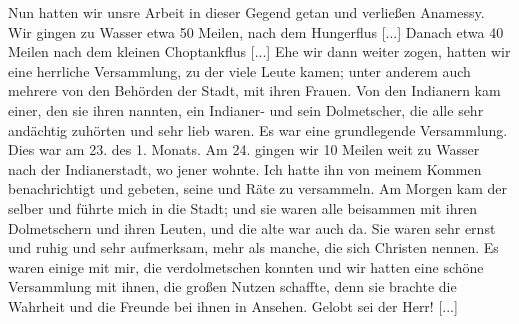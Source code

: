 Nun hatten wir unsre Arbeit in dieser Gegend getan und
verließen Anamessy. Wir gingen zu Wasser etwa 50 Meilen,
nach dem Hungerflus [...] Danach etwa 40 Meilen nach dem
kleinen Choptankflus [...] Ehe wir dann weiter zogen, hatten
wir eine herrliche Versammlung, zu der viele Leute kamen; unter
anderem auch mehrere von den Behörden der Stadt, mit ihren
Frauen. Von den Indianern kam einer, den sie ihren 
nannten, ein Indianer- und sein Dolmetscher, die alle sehr
andächtig zuhörten und sehr lieb waren. Es war eine grundlegende 
Versammlung. Dies war am 23. des 1. Monats. Am
24. gingen wir 10 Meilen weit zu Wasser nach der Indianerstadt, 
wo jener  wohnte. Ich hatte ihn von meinem Kommen
benachrichtigt und gebeten, seine  und Räte zu versammeln.
Am Morgen kam der  selber und führte mich in die Stadt;
und sie waren alle beisammen mit ihren Dolmetschern und ihren
Leuten, und die alte  war auch da. Sie waren sehr ernst
und ruhig und sehr aufmerksam, mehr als manche, die sich Christen
nennen. Es waren einige mit mir, die verdolmetschen konnten
und wir hatten eine schöne Versammlung mit ihnen, die großen
Nutzen schaffte, denn sie brachte die Wahrheit und die Freunde
bei ihnen in Ansehen. Gelobt sei der Herr! [...]

